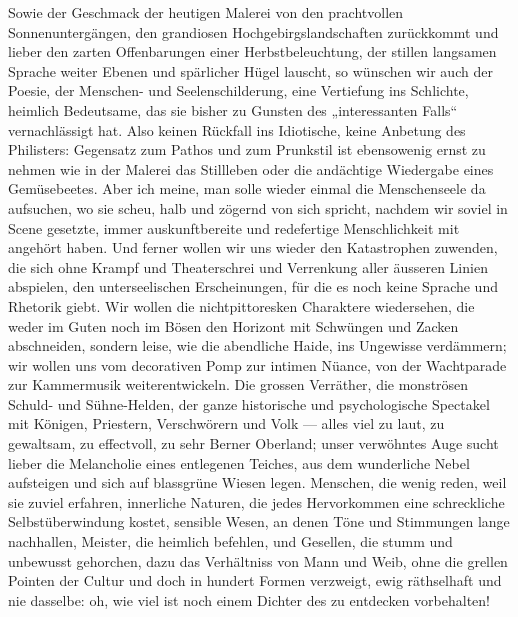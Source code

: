 Sowie der Geschmack der heutigen Malerei von den prachtvollen Sonnenuntergängen, den grandiosen Hochgebirgslandschaften zurückkommt und lieber den zarten Offenbarungen einer Herbstbeleuchtung, der stillen langsamen Sprache weiter Ebenen und spärlicher Hügel lauscht, so wünschen wir auch der Poesie, der Menschen- und Seelenschilderung, eine Vertiefung ins Schlichte, heimlich Bedeutsame, das sie bisher zu Gunsten des „interessanten Falls“ vernachlässigt hat. Also keinen Rückfall ins Idiotische, keine Anbetung des Philisters:  Gegensatz zum Pathos und zum Prunkstil ist ebensowenig ernst zu nehmen wie in der Malerei das Stillleben oder die andächtige Wiedergabe eines Gemüsebeetes. Aber ich meine, man solle wieder einmal die Menschenseele da aufsuchen, wo sie scheu, halb und zögernd von sich spricht, nachdem wir soviel in Scene gesetzte, immer auskunftbereite und redefertige Menschlichkeit mit angehört haben. Und ferner wollen wir uns wieder den Katastrophen zuwenden, die sich ohne Krampf und Theaterschrei und Verrenkung aller äusseren Linien abspielen, den unterseelischen Erscheinungen, für die es noch keine Sprache und Rhetorik giebt. Wir wollen die nichtpittoresken Charaktere wiedersehen, die weder im Guten noch im Bösen den Horizont mit Schwüngen und Zacken abschneiden, sondern leise, wie die abendliche Haide, ins Ungewisse verdämmern; wir wollen uns vom decorativen Pomp zur intimen Nüance, von der Wachtparade zur Kammermusik weiterentwickeln. Die grossen Verräther, die monströsen Schuld- und Sühne-Helden, der ganze historische und psychologische Spectakel mit Königen, Priestern, Verschwörern und Volk — alles viel zu laut, zu gewaltsam, zu effectvoll, zu sehr Berner Oberland; unser verwöhntes Auge sucht lieber die Melancholie eines entlegenen Teiches, aus dem wunderliche Nebel aufsteigen und sich auf blassgrüne Wiesen legen. Menschen, die wenig reden, weil sie zuviel erfahren, innerliche Naturen, die jedes Hervorkommen eine schreckliche Selbstüberwindung kostet, sensible Wesen, an denen Töne und Stimmungen lange nachhallen, Meister, die heimlich befehlen, und Gesellen, die stumm und unbewusst gehorchen, dazu das Verhältniss von Mann und Weib, ohne die grellen Pointen der Cultur und doch in hundert Formen verzweigt, ewig räthselhaft und nie dasselbe: oh, wie viel ist noch einem Dichter des  zu entdecken vorbehalten!
\par


